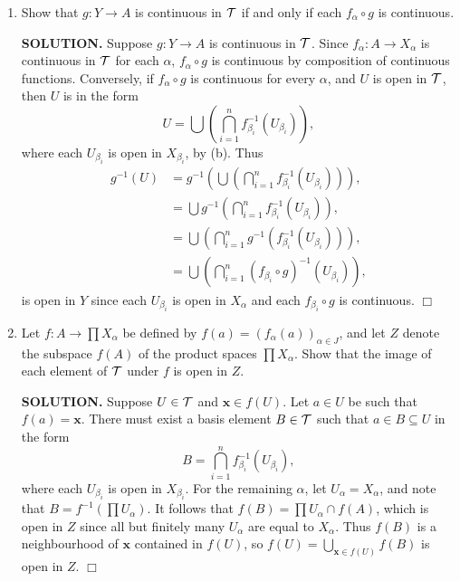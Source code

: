 \documentclass{article}
\begin{document}
\begin{enumerate}
\begin{enumerate}
        \item Show that $g: Y \rightarrow A$ is continuous in $\mathcal{T}$ if and only if each $f_\alpha \circ g$ is continuous.

        {\bf SOLUTION.} Suppose $g: Y \rightarrow A$ is continuous in $\mathcal{T}$. Since $f_\alpha: A \rightarrow X_\alpha$ is continuous in $\mathcal{T}$ for each $\alpha$, $f_\alpha \circ g$ is continuous by composition of continuous functions. Conversely, if $f_\alpha \circ g$ is continuous for every $\alpha$, and $U$ is open in $\mathcal{T}$, then $U$ is in the form
        $$U = \bigcup \left(\bigcap_{i=1}^n f^{-1}_{\beta_i}(U_{\beta_i})\right),$$
        where each $U_{\beta_i}$ is open in $X_{\beta_i}$, by (b). Thus 
        \begin{align*}
            g^{-1}(U) &= g^{-1}\left(\bigcup \left(\bigcap_{i=1}^n f^{-1}_{\beta_i}(U_{\beta_i})\right)\right), \\
            &= \bigcup g^{-1} \left(\bigcap_{i=1}^n f^{-1}_{\beta_i}(U_{\beta_i})\right), \\
            &= \bigcup \left(\bigcap_{i=1}^n g^{-1} \left(f^{-1}_{\beta_i}(U_{\beta_i})\right)\right), \\
            &= \bigcup \left(\bigcap_{i=1}^n (f_{\beta_i} \circ g)^{-1} (U_{\beta_i})\right),
        \end{align*}
        is open in $Y$ since each $U_{\beta_i}$ is open in $X_\alpha$ and each $f_{\beta_i} \circ g$ is continuous. $\Box$

        \item Let $f: A \rightarrow \prod X_\alpha$ be defined by $f(a) = (f_\alpha(a))_{\alpha \in J}$, and let $Z$ denote the subspace $f(A)$ of the product spaces $\prod X_\alpha$. Show that the image of each element of $\mathcal{T}$ under $f$ is open in $Z$.

        {\bf SOLUTION.} Suppose $U \in \mathcal{T}$ and $\mathbf{x} \in f(U)$. Let $a \in U$ be such that $f(a) = \mathbf{x}$. There must exist a basis element $B \in \mathcal{T}$ such that $a \in B \subseteq U$ in the form
        $$B = \bigcap_{i=1}^n f^{-1}_{\beta_i}(U_{\beta_i}),$$
        where each $U_{\beta_i}$ is open in $X_{\beta_i}$. For the remaining $\alpha$, let $U_\alpha = X_\alpha$, and note that $B = f^{-1}(\prod U_\alpha)$. It follows that $f(B) = \prod U_\alpha \cap f(A)$, which is open in $Z$ since all but finitely many $U_\alpha$ are equal to $X_\alpha$. Thus $f(B)$ is a neighbourhood of $\mathbf{x}$ contained in $f(U)$, so $f(U) = \bigcup_{\mathbf{x} \in f(U)} f(B)$ is open in $Z$. $\Box$
    \end{enumerate}
\end{enumerate}
\end{document}
